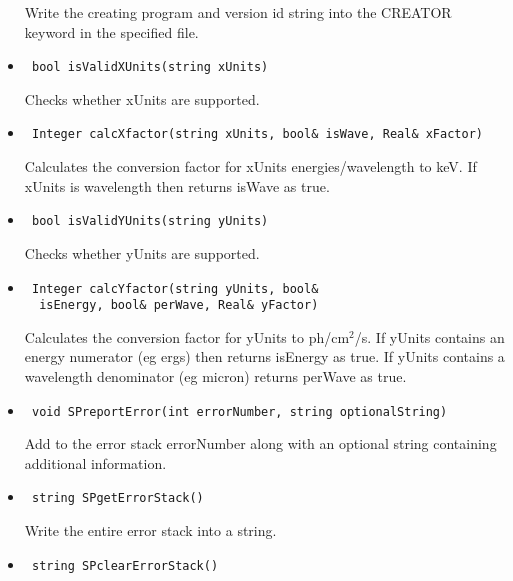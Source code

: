 \documentclass[11pt]{book}
\begin{document}
\begin{itemize}
          Write the creating program and version id string into the
          CREATOR keyword in the specified file.

\item  \begin{verbatim} bool isValidXUnits(string xUnits) \end{verbatim}

          Checks whether xUnits are supported.

\item  \begin{verbatim} Integer calcXfactor(string xUnits, bool& isWave, Real& xFactor) \end{verbatim}

          Calculates the conversion factor for xUnits
          energies/wavelength to keV. If xUnits is wavelength then
          returns isWave as true.

\item  \begin{verbatim} bool isValidYUnits(string yUnits) \end{verbatim}

          Checks whether yUnits are supported.

\item  \begin{verbatim} Integer calcYfactor(string yUnits, bool&
  isEnergy, bool& perWave, Real& yFactor) \end{verbatim}

          Calculates the conversion factor for yUnits to ph/cm$^2$/s.
          If yUnits contains an energy numerator (eg ergs) then
          returns isEnergy as true. If yUnits contains a wavelength
          denominator (eg micron) returns perWave as true.

\item  \begin{verbatim} void SPreportError(int errorNumber, string optionalString) \end{verbatim}

          Add to the error stack errorNumber along with an optional
          string containing additional information.

\item  \begin{verbatim} string SPgetErrorStack() \end{verbatim}

          Write the entire error stack into a string.

\item  \begin{verbatim} string SPclearErrorStack() \end{verbatim}


\end{itemize}
\end{document}
